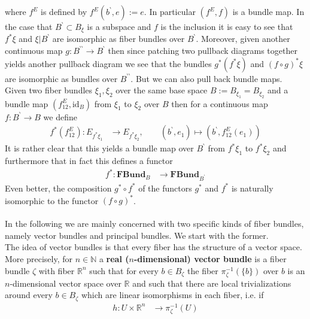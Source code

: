 where $f^{E}$ is defined by $f^{E}(b^{\backprime},e) := e$. In particular $(f^{E},f)$ is a bundle map. In the case that $B^{\backprime} \subset B_{\xi}$ is a subspace and $f$ is the inclusion it is easy to see that $f^{\ast}\xi$ and $\xi \vert B^{\backprime}$ are isomorphic as fiber bundles over $B^{\backprime}$. Moreover, given another continuous map $g \colon B^{\backprime\backprime} \to B^{\backprime}$ then since patching two pullback diagrams together yields another pullback diagram we see that the bundles $g^{\ast}(f^{\ast}\xi)$ and $(f \circ g)^{\ast}\xi$ are isomorphic as bundles over $B^{\backprime\backprime}$. But we can also pull back bundle maps. Given two fiber bundles $\xi_{1},\xi_{2}$ over the same base space $B := B_{\xi_{1}} = B_{\xi_{2}}$ and a bundle map $(f_{12}^{E},\mathrm{id}_{B})$ from $\xi_{1}$ to $\xi_{2}$ over $B$ then for a continuous map $f \colon B^{\backprime} \to B$ we define
\begin{align*}
  f^{\ast}(f_{12}^{E})
  \colon
  E_{f^{\ast}\xi_{1}}
  &\to
  E_{f^{\ast}\xi_{2}}
  ,\qquad
  (b^{\backprime},e_{1})
  \mapsto
  (b^{\backprime},f_{12}^{E}(e_{1}))
\end{align*}
It is rather clear that this yields a bundle map over $B^{\backprime}$ from $f^{\ast}\xi_{1}$ to $f^{\ast}\xi_{2}$ and furthermore that in fact this defines a functor
\begin{align*}
  f^{\ast}
  \colon
  \mathbf{FBund}_{B}
  &\to
  \mathbf{FBund}_{B^{\backprime}}
\end{align*}
Even better, the composition $g^{\ast} \circ f^{\ast}$ of the functors $g^{\ast}$ and $f^{\ast}$ is naturally isomorphic to the functor $(f \circ g)^{\ast}$.
\\\\
In the following we are mainly concerned with two specific kinds of fiber bundles, namely vector bundles and principal bundles. We start with the former.
\\
The idea of vector bundles is that every fiber has the structure of a vector space. More precisely, for $n \in \mathbb{N}$ a \textbf{real ($n$-dimensional) vector bundle} is a fiber bundle $\zeta$ with fiber $\mathbb{R}^{n}$ such that for every $b \in B_{\zeta}$ the fiber $\pi_{\zeta}^{-1}(\lbrace b \rbrace)$ over $b$ is an $n$-dimensional vector space over $\mathbb{R}$ and such that there are local trivializations around every $b \in B_{\zeta}$ which are linear isomorphisms in each fiber, i.e. if
\begin{align*}
  h
  \colon
  U
  \times
  \mathbb{R}^{n}
  &\to
  \pi_{\zeta}^{-1}(U)
\end{align*}
